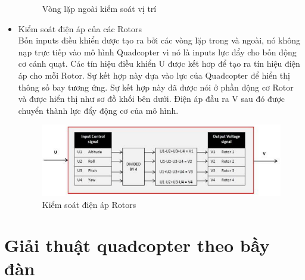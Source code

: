 \begin{itemize}
\begin{figure}[h!]
\begin{center}
	        		\caption{Vòng lặp ngoài kiểm soát vị trí}
	        	\end{center}
        \end{figure}
			\item Kiểm soát điện áp của các Rotors
			\\
			Bốn inputs điều khiển được tạo ra bởi các vòng lặp trong và ngoài, nó không nạp trực tiếp vào mô hình Quadcopter vì nó là inputs lực đẩy cho bốn động cơ cánh quạt. Các tín hiệu điều khiển U được kết hơp để tạo ra tín hiệu điện áp cho mỗi Rotor. Sự kết hợp này dựa vào lực của Quadcopter để hiển thị thông số bay tương ứng. Sự kết hợp này đã được nói ở phần động cơ Rotor và được hiển thị như sơ đồ khối bên dưới. Điện áp đầu ra V sau đó được chuyển thành lực đẩy động cơ của mô hình.
  \\
  \begin{figure}[h!]
	        	\begin{center}
	        		\includegraphics[scale=0.8]{images/Cuong-VolControl.png}
	        		\caption{Kiểm soát điện áp Rotors}
	        	\end{center}
        \end{figure}
			\end{itemize}
			\section{Giải thuật quadcopter theo bầy đàn}
